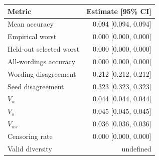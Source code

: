\begin{tabular}{@{}lr@{}}
\toprule
Metric & Estimate [95\% CI] \\
\midrule
Mean accuracy & 0.094 [0.094, 0.094] \\
Empirical worst & 0.000 [0.000, 0.000] \\
Held-out selected worst & 0.000 [0.000, 0.000] \\
All-wordings accuracy & 0.000 [0.000, 0.000] \\
Wording disagreement & 0.212 [0.212, 0.212] \\
Seed disagreement & 0.323 [0.323, 0.323] \\
$V_w$ & 0.044 [0.044, 0.044] \\
$V_s$ & 0.045 [0.045, 0.045] \\
$V_{ws}$ & 0.036 [0.036, 0.036] \\
Censoring rate & 0.000 [0.000, 0.000] \\
Valid diversity & undefined \\
\bottomrule
\end{tabular}\par\medskip
